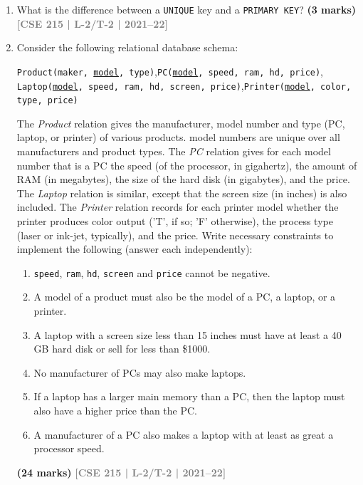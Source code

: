 \documentclass[12pt]{article}
\newcommand{\yr}[1]{\hfill\textcolor{gray}{\small\textbf{[#1]}}}
\newcommand{\mk}[1]{\textcolor{orange!70!black}{\small\textbf{(#1 marks)}}}
\begin{document}
\begin{enumerate}



\item What is the difference between a \texttt{UNIQUE} key and a \texttt{PRIMARY KEY}?
\mk{3} \yr{CSE 215 | L-2/T-2 | 2021--22}


\item Consider the following relational database schema:
\begin{center}
\texttt{Product(maker, \underline{model}, type)},\quad \texttt{PC(\underline{model}, speed, ram, hd, price)},\\
\texttt{Laptop(\underline{model}, speed, ram, hd, screen, price)},\quad \texttt{Printer(\underline{model}, color, type, price)}
\end{center}
The \textit{Product} relation gives the manufacturer, model number and type (PC, laptop, or printer) of various products. model numbers are unique over all manufacturers and product types. The \textit{PC} relation gives for each model number that is a PC the speed (of the processor, in gigahertz), the amount of RAM (in megabytes), the size of the hard disk (in gigabytes), and the price. The \textit{Laptop} relation is similar, except that the screen size (in inches) is also included. The \textit{Printer} relation records for each printer model whether the printer produces color output ('T', if so; 'F' otherwise), the process type (laser or ink-jet, typically), and the price.
Write necessary constraints to implement the following (answer each independently):
\begin{enumerate}
  \item \texttt{speed}, \texttt{ram}, \texttt{hd}, \texttt{screen} and \texttt{price} cannot be negative.
  \item A model of a product must also be the model of a PC, a laptop, or a printer.
  \item A laptop with a screen size less than 15 inches must have at least a 40 GB hard disk or sell for less than \$1000.
  \item No manufacturer of PCs may also make laptops.
  \item If a laptop has a larger main memory than a PC, then the laptop must also have a higher price than the PC.
  \item A manufacturer of a PC also makes a laptop with at least as great a processor speed.
\end{enumerate}
\mk{24} \yr{CSE 215 | L-2/T-2 | 2021--22}



\end{enumerate}
\end{document}
